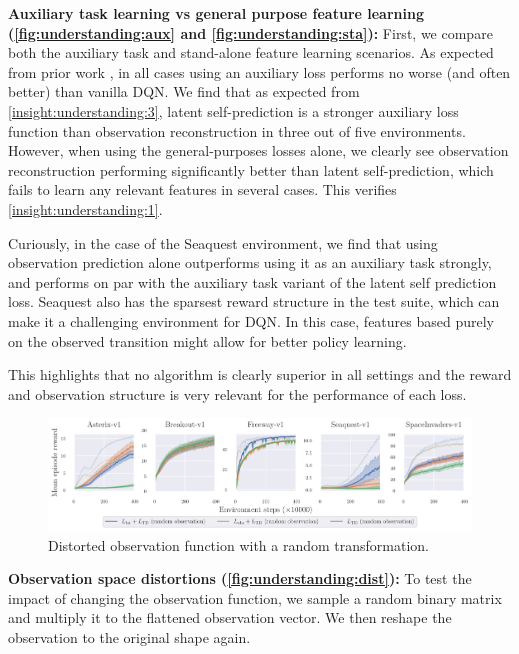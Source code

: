 \textbf{Auxiliary task learning vs general purpose feature learning (\autoref{fig:understanding:aux} and \autoref{fig:understanding:sta}):}
First, we compare both the auxiliary task and stand-alone feature learning scenarios.
As expected from prior work \parencite{jaderberg2016reinforcement,schwarzer2021dataefficient,farebrother2023protovalue}, in all cases using an auxiliary loss performs no worse (and often better) than vanilla DQN.
We find that as expected from \autoref{insight:understanding:3}, latent self-prediction is a stronger auxiliary loss function than observation reconstruction in three out of five environments.
However, when using the general-purposes losses alone, we clearly see observation reconstruction performing significantly better than latent self-prediction, which fails to learn any relevant features in several cases. This verifies \autoref{insight:understanding:1}.

Curiously, in the case of the Seaquest environment, we find that using observation prediction alone outperforms using it as an auxiliary task strongly, and performs on par with the auxiliary task variant of the latent self prediction loss.
Seaquest also has the sparsest reward structure in the test suite, which can make it a challenging environment for DQN. In this case, features based purely on the observed transition might allow for better policy learning.

This highlights that no algorithm is clearly superior in all settings and the reward and observation structure is very relevant for the performance of each loss.


\begin{figure}[t]
    \centering
    \includegraphics[width=\textwidth]{figures/understanding/rlc2024-distorted-fixed_minatar.pdf}
    \caption{Distorted observation function with a random transformation.}
    \label{fig:understanding:dist}
\end{figure}

\textbf{Observation space distortions (\autoref{fig:understanding:dist}):} To test the impact of changing the observation function, we sample a random binary matrix and multiply it to the flattened observation vector. We then reshape the observation to the original shape again.

